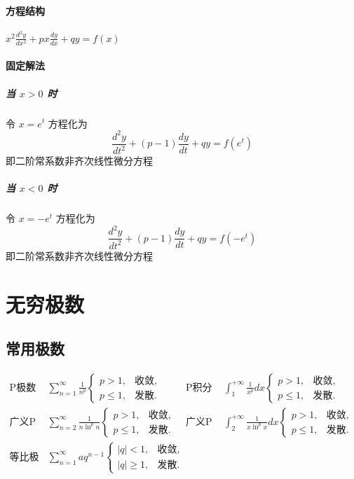 ﻿\documentclass[a4paper,12pt,UTF8]{ctexart}
\begin{document}
    \paragraph{方程结构} \(x^{2}\frac{d^2y}{dx^2}+px\frac{dy}{dx}+qy=f(x)\)
    \paragraph{固定解法}
    \subparagraph{当 \(x>0\) 时} 令 \(x=e^t\) 方程化为 \[\frac{d^2y}{dt^2}+(p-1)\frac{dy}{dt}+qy=f(e^t)\] 即二阶常系数非齐次线性微分方程
    \subparagraph{当 \(x<0\) 时} 令 \(x=-e^t\) 方程化为 \[\frac{d^2y}{dt^2}+(p-1)\frac{dy}{dt}+qy=f(-e^t)\] 即二阶常系数非齐次线性微分方程

    \section{无穷极数}

    \subsection{常用极数}
    \begin{align*}
        \text{P极数}\enspace& \sum_{n=1}^{\infty}\frac{1}{n^{p}}
        \begin{cases}
            p>1,&\text{收敛},\\
            p \leq 1,&\text{发散}.
        \end{cases}&
        \text{P积分}\enspace& \int_{1}^{+\infty}\frac{1}{x^{p}}dx
        \begin{cases}
            p>1,&\text{收敛},\\
            p \leq 1,&\text{发散}.
        \end{cases}&\\
        \text{广义P极数}\enspace& \sum_{n=2}^{\infty}\frac{1}{n \ln^p n}
        \begin{cases}
            p>1,&\text{收敛},\\
            p \leq 1,&\text{发散}.
        \end{cases}&
        \text{广义P积分}\enspace& \int_{2}^{+\infty}\frac{1}{x \ln^p x}dx
        \begin{cases}
            p>1,&\text{收敛},\\
            p \leq 1,&\text{发散}.
        \end{cases}&\\
        \text{等比极数}\enspace& \sum_{n=1}^{\infty}aq^{n-1}
        \begin{cases}
            |q|<1,&\text{收敛},\\
            |q| \geq 1,&\text{发散}.
        \end{cases}&\\
    \end{align*}
\end{document}
